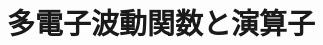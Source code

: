 \documentclass[10pt,dvipdfmx,report]{jsbook}
\begin{document}
\pagestyle{empty}

%
%
% 

\chapter{多電子波動関数と演算子}

\end{document}
